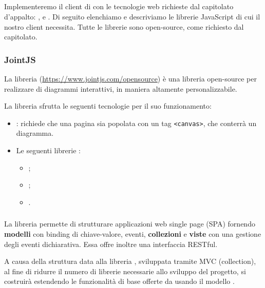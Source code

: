 


\subsection{}
Implementeremo il client di \proj{} con le tecnologie web richieste dal capitolato d'appalto: ,  e . Di seguito elenchiamo e descriviamo le librerie JavaScript di cui il nostro client necessita. Tutte le librerie sono open-source, come richiesto dal capitolato.

\subsubsection{JointJS}
La libreria \jointjs{} (\url{https://www.jointjs.com/opensource}) è una libreria open-source per realizzare  di diagrammi interattivi, in maniera altamente personalizzabile. %

La libreria sfrutta le seguenti tecnologie per il suo funzionamento:
\begin{itemize}
	\item \html{}: \jointjs{} richiede che una pagina \html{} sia popolata con un tag \texttt{<canvas>}, che conterrà un diagramma.
	\item Le seguenti librerie \js{}:
	\begin{itemize}
		\item \jquery{};
		\item \lodash{};
		\item \backbonejs{}.
	\end{itemize}
\end{itemize}

\subsubsection{\backbonejs}
La libreria \backbonejs{} permette di strutturare applicazioni web single page (SPA) fornendo \textbf{modelli} con binding di chiave-valore, eventi, \textbf{collezioni} e \textbf{viste} con una gestione degli eventi dichiarativa. Essa offre inoltre una interfaccia RESTful.

A causa della struttura data alla libreria \jointjs{}, sviluppata tramite MVC (collection), al fine di ridurre il numero di librerie necessarie allo sviluppo del progetto, si costruirà \proj{} estendendo le funzionalità di base offerte da \jointjs{} usando il modello \mvc{}. %


